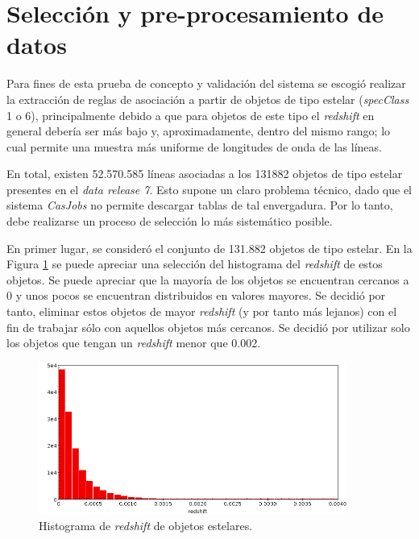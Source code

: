 \section{Selección y pre-procesamiento de datos}

Para fines de esta prueba de concepto y validación del sistema se escogió realizar la extracción de reglas de asociación a partir de objetos de tipo estelar (\textit{specClass} 1 o 6), principalmente debido a que para objetos de este tipo el \textit{redshift} en general debería ser más bajo y, aproximadamente, dentro del mismo rango; lo cual permite una muestra más uniforme de longitudes de onda de las líneas.

En total, existen 52.570.585 líneas asociadas a los 131882 objetos de tipo estelar presentes en el \textit{data release 7}. Esto supone un claro problema técnico, dado que el sistema \textit{CasJobs} no permite descargar tablas de tal envergadura. Por lo tanto, debe realizarse un proceso de selección lo más sistemático posible. 

En primer lugar, se consideró el conjunto de 131.882 objetos de tipo estelar. En la Figura \ref{fig:stelar_obj_redshift} se puede apreciar una selección del histograma del \textit{redshift} de estos objetos. Se puede apreciar que la mayoría de los objetos se encuentran cercanos a 0 y unos pocos se encuentran distribuidos en valores mayores. Se decidió por tanto, eliminar estos objetos de mayor \textit{redshift} (y por tanto más lejanos) con el fin de trabajar sólo con aquellos objetos más cercanos. Se decidió por utilizar solo los objetos que tengan un \textit{redshift} menor que 0.002.

\begin{figure}[h!]
\begin{center}
\includegraphics[width=0.9\textwidth]{imagenes/stelar_obj_redshift_hist.png}
\end{center}
\vspace*{-5mm}
\caption{Histograma de \textit{redshift} de objetos estelares.}
\label{fig:stelar_obj_redshift}
\end{figure}

